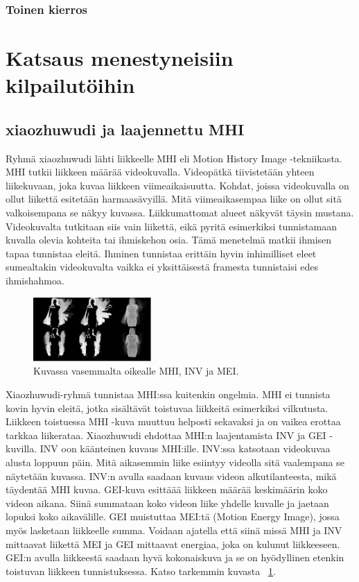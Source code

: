 \subsubsection {Toinen kierros}
\newpage
\section {Katsaus menestyneisiin kilpailutöihin}

\subsection{xiaozhuwudi ja laajennettu MHI}
Ryhmä xiaozhuwudi lähti liikkeelle MHI eli Motion History Image -tekniikasta. \citep {6239179} MHI tutkii liikkeen määrää videokuvalla.
Videopätkä tiivistetään yhteen liikekuvaan, joka kuvaa liikkeen viimeaikaisuutta. Kohdat, joissa videokuvalla on ollut
liikettä esitetään harmaasävyillä. Mitä viimeaikasempaa liike on ollut sitä valkoisempana se näkyy kuvassa. Liikkumattomat
alueet näkyvät täysin mustana. Videokuvalta tutkitaan siis vain liikettä, eikä pyritä esimerkiksi tunnistamaan kuvalla olevia kohteita
tai ihmiskehon osia. Tämä menetelmä matkii ihmisen tapaa tunnistaa eleitä. Ihminen tunnistaa erittäin hyvin inhimilliset eleet  
sumealtakin videokuvalta vaikka ei yksittäisestä framesta tunnistaisi edes ihmishahmoa. \citep {910878}  \\
\begin{figure}[htb]
  \begin{center}
    \includegraphics[width=0.4\textwidth]{mhi_ex.jpg}
    \caption{Kuvassa vasemmalta oikealle MHI, INV ja MEI. \citep {6239179}}
    \label{fig:mhiinvmei}
  \end{center}
\end{figure}
Xiaozhuwudi-ryhmä tunnistaa MHI:ssa kuitenkin ongelmia. MHI ei tunnista kovin hyvin eleitä, jotka sisältävät toistuvaa liikkeitä esimerkiksi vilkutusta.
Liikkeen toistuessa MHI -kuva muuttuu helposti sekavaksi ja on vaikea erottaa tarkkaa liikerataa. Xiaozhuwudi ehdottaa MHI:n laajentamista INV ja GEI -kuvilla.
INV oon käänteinen kuvaus MHI:ille. INV:ssa katsotaan videokuvaa alusta loppuun päin.
Mitä aikasemmin liike esiintyy videolla sitä vaalempana se näytetään kuvassa. INV:n avulla saadaan kuvaus videon alkutilanteesta, mikä täydentää MHI kuvaa. 
GEI-kuva esittäää liikkeen määrää keskimäärin koko videon aikana. Siinä summataan koko videon liike yhdelle kuvalle ja jaetaan lopuksi koko aikavälille.
GEI muistuttaa MEI:tä (Motion Energy Image), jossa myös lasketaan liikkeelle summa. Voidaan ajatella että siinä missä MHI ja INV mittaavat liikettä 
MEI ja GEI mittaavat energiaa, joka on kulunut liikkeeseen. GEI:n avulla liikkeestä saadaan hyvä kokonaiskuva ja se on hyödyllinen etenkin toistuvan
liikkeen tunnistuksessa. \citep {6239179} Katso tarkemmin kuvasta  ~\ref{fig:mhiinvmei}. \\

